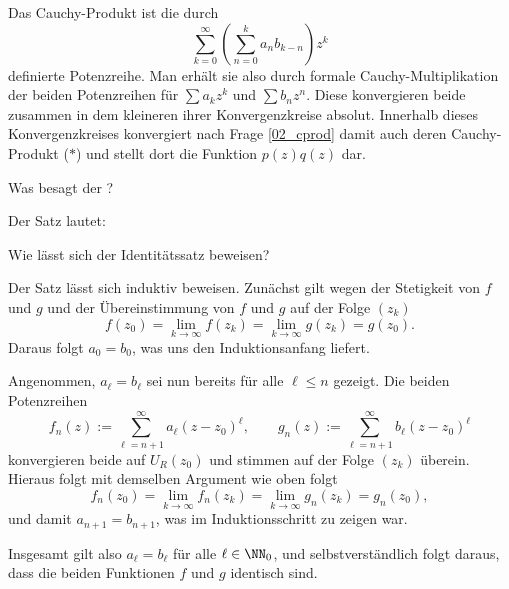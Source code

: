 \begin{antwort}
Das Cauchy-Produkt ist die durch 
\begin{equation}
\sum_{k=0}^\infty \left( \sum_{n=0}^k a_n b_{k-n} \right) z^k \tag{$\ast$}
\end{equation}
definierte Potenzreihe. 
Man erhält sie also durch formale Cauchy-Multiplikation der beiden 
Potenzreihen für $\sum a_kz^k$ und $\sum b_n z^n$. Diese konvergieren 
beide zusammen in dem kleineren ihrer Konvergenzkreise absolut. 
Innerhalb dieses Konvergenzkreises konvergiert nach Frage 
\ref{02_cprod} damit auch deren Cauchy-Produkt ($\ast$) und stellt 
dort die Funktion $p(z)q(z)$ dar.
\AntEnd
\end{antwort}



\begin{frage}
Was besagt der ? 
\end{frage}

\begin{antwort}
Der Satz lautet: 

\medskip\noindent
{} \AntEnd
\end{antwort}

\begin{frage}
Wie lässt sich der Identitätssatz beweisen?
\end{frage} 

\begin{antwort}
Der Satz lässt sich induktiv beweisen. Zunächst gilt wegen 
der Stetigkeit von $f$ und $g$ und der Übereinstimmung von 
$f$ und $g$ auf der Folge $(z_k)$
\[
f(z_0)=\lim_{k\to\infty} f(z_k) = \lim_{k\to\infty} g(z_k) = g(z_0).
\]
Daraus folgt $a_0=b_0$, was uns den Induktionsanfang liefert. 

Angenommen, $a_\ell=b_\ell$ sei nun bereits für alle $\ell\le n$ gezeigt. 
Die beiden Potenzreihen 
\[
f_n (z) := \sum_{\ell=n+1}^\infty a_\ell(z-z_0)^\ell, \qquad
g_n (z) := \sum_{\ell=n+1}^\infty b_\ell(z-z_0)^\ell 
\]
konvergieren beide auf $U_R(z_0)$ und stimmen auf der Folge 
$(z_k)$ überein. Hieraus folgt mit demselben Argument wie oben folgt
\[
f_n(z_0)=\lim_{k\to\infty} f_n(z_k) = \lim_{k\to\infty} g_n(z_k) = g_n(z_0),
\]
und damit $a_{n+1}=b_{n+1}$, was im Induktionsschritt zu zeigen war. 

Insgesamt gilt also $a_\ell=b_\ell$ für alle $\ell\in\NN_0$, 
und selbstverständlich 
folgt daraus, dass die beiden Funktionen $f$ und $g$ identisch sind.
\AntEnd 
\end{antwort} 



  

 

 
